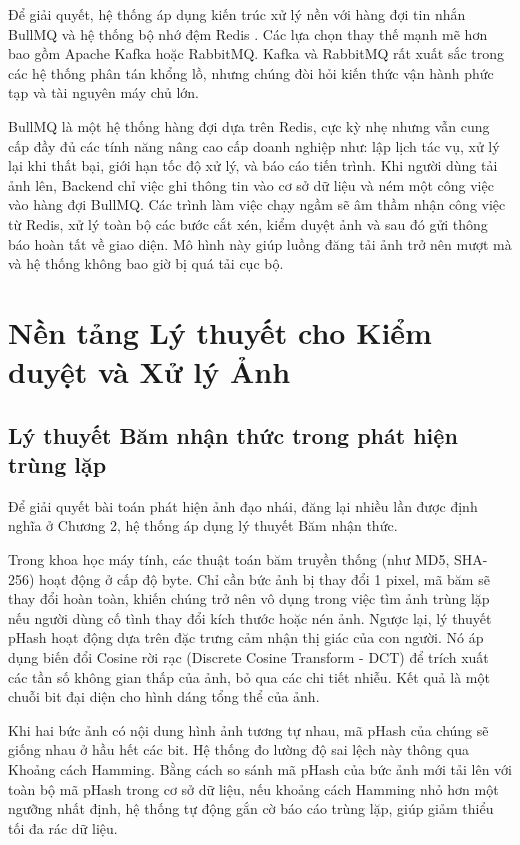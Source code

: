 Để giải quyết, hệ thống áp dụng kiến trúc xử lý nền với hàng đợi tin nhắn BullMQ và hệ thống bộ nhớ đệm Redis \cite{bullmq}. Các lựa chọn thay thế mạnh mẽ hơn bao gồm Apache Kafka hoặc RabbitMQ. Kafka và RabbitMQ rất xuất sắc trong các hệ thống phân tán khổng lồ, nhưng chúng đòi hỏi kiến thức vận hành phức tạp và tài nguyên máy chủ lớn.

BullMQ là một hệ thống hàng đợi dựa trên Redis, cực kỳ nhẹ nhưng vẫn cung cấp đầy đủ các tính năng nâng cao cấp doanh nghiệp như: lập lịch tác vụ, xử lý lại khi thất bại, giới hạn tốc độ xử lý, và báo cáo tiến trình. Khi người dùng tải ảnh lên, Backend chỉ việc ghi thông tin vào cơ sở dữ liệu và ném một công việc vào hàng đợi BullMQ. Các trình làm việc chạy ngầm sẽ âm thầm nhận công việc từ Redis, xử lý toàn bộ các bước cắt xén, kiểm duyệt ảnh và sau đó gửi thông báo hoàn tất về giao diện. Mô hình này giúp luồng đăng tải ảnh trở nên mượt mà và hệ thống không bao giờ bị quá tải cục bộ.

\section{Nền tảng Lý thuyết cho Kiểm duyệt và Xử lý Ảnh}

\subsection{Lý thuyết Băm nhận thức trong phát hiện trùng lặp}

Để giải quyết bài toán phát hiện ảnh đạo nhái, đăng lại nhiều lần được định nghĩa ở Chương 2, hệ thống áp dụng lý thuyết Băm nhận thức. 

Trong khoa học máy tính, các thuật toán băm truyền thống (như MD5, SHA-256) hoạt động ở cấp độ byte. Chỉ cần bức ảnh bị thay đổi 1 pixel, mã băm sẽ thay đổi hoàn toàn, khiến chúng trở nên vô dụng trong việc tìm ảnh trùng lặp nếu người dùng cố tình thay đổi kích thước hoặc nén ảnh. Ngược lại, lý thuyết pHash hoạt động dựa trên đặc trưng cảm nhận thị giác của con người. Nó áp dụng biến đổi Cosine rời rạc (Discrete Cosine Transform - DCT) để trích xuất các tần số không gian thấp của ảnh, bỏ qua các chi tiết nhiễu. Kết quả là một chuỗi bit đại diện cho hình dáng tổng thể của ảnh.

Khi hai bức ảnh có nội dung hình ảnh tương tự nhau, mã pHash của chúng sẽ giống nhau ở hầu hết các bit. Hệ thống đo lường độ sai lệch này thông qua Khoảng cách Hamming. Bằng cách so sánh mã pHash của bức ảnh mới tải lên với toàn bộ mã pHash trong cơ sở dữ liệu, nếu khoảng cách Hamming nhỏ hơn một ngưỡng nhất định, hệ thống tự động gắn cờ báo cáo trùng lặp, giúp giảm thiểu tối đa rác dữ liệu.

